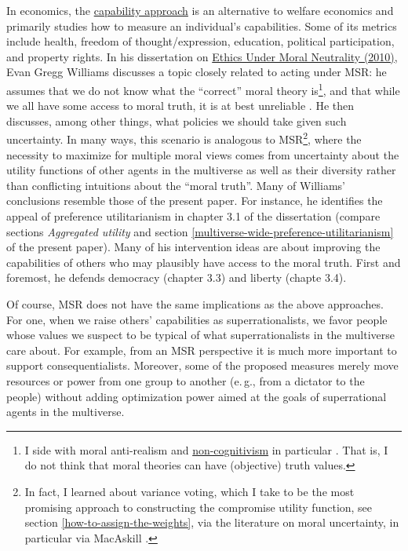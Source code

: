 In economics, the
\href{https://en.wikipedia.org/wiki/Capability_approach}{capability
approach} is an alternative to welfare economics and primarily studies
how to measure an individual's capabilities. Some of its metrics include
health, freedom of thought/expression, education, political
participation, and property rights. In his dissertation on
\href{https://rucore.libraries.rutgers.edu/rutgers-lib/34078/pdf/1/}{Ethics
Under Moral Neutrality (2010)}, Evan
Gregg Williams discusses a topic closely related to acting
under MSR: he assumes that we do not know what the ``correct'' moral
theory is\footnote{\label{non-cognitivism} I side with moral anti-realism
  \parencite{Joyce2016-no} and
  \href{https://en.wikipedia.org/wiki/Non-cognitivism}{non-cognitivism}
  in particular \parencite{Joyce2016-no}. That is, I do not
  think that moral theories can have (objective) truth values.}, and
that while we all have some access to moral truth, it is at best
unreliable \parencite{Williams2011-ul}. He then discusses,
among other things, what policies we should take given such uncertainty.
In many ways, this scenario is analogous to MSR\footnote{In fact, I
  learned about variance voting, which I take to be the most promising
  approach to constructing the compromise utility function, see section
  \ref{how-to-assign-the-weights}, via the literature on moral uncertainty, in
  particular via MacAskill \citeyear{MacAskill2014-ca}.}, where the
necessity to maximize for multiple moral views comes from uncertainty
about the utility functions of other agents in the multiverse as well as
their diversity rather than conflicting intuitions about the ``moral
truth''. Many of Williams' conclusions resemble those of the present
paper. For instance, he identifies the appeal of preference
utilitarianism in chapter 3.1 of the dissertation (compare sections \emph{Aggregated utility} and
section \ref{multiverse-wide-preference-utilitarianism} of the present paper). 
Many of his
intervention ideas are about improving the capabilities of others who
may plausibly have access to the moral truth. First and foremost, he
defends democracy (chapter 3.3) and liberty (chapte 3.4).

Of course, MSR does not have the same implications as the above
approaches. For one, when we raise others' capabilities as
superrationalists, we favor people whose values we suspect to be typical
of what superrationalists in the multiverse care about. For example,
from an MSR perspective it is much more important to support
consequentialists. Moreover, some of the proposed measures merely move
resources or power from one group to another (e.\,g., from a dictator to
the people) without adding optimization power aimed at the goals of
superrational agents in the multiverse.


